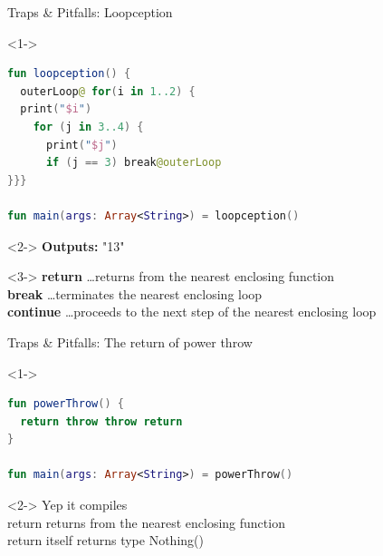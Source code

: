 \begin{frame}[fragile]{Traps \& Pitfalls: Loopception}
	\begin{overlayarea}{\textwidth}{\textheight}
		\begin{onlyenv}<1->
\begin{lstlisting}[language=Kotlin,basicstyle=\ttfamily\small]
fun loopception() {
  outerLoop@ for(i in 1..2) {
  print("$i")
    for (j in 3..4) {
      print("$j")
      if (j == 3) break@outerLoop
}}}

fun main(args: Array<String>) = loopception()
\end{lstlisting}
		\end{onlyenv}
		\begin{onlyenv}<2->
			\textbf{Outputs:} "13"\\\vspace{\baselineskip}
		\end{onlyenv}
		\begin{onlyenv}<3->
			\textbf{return} \dots returns from the nearest enclosing function\\
			\textbf{break} \dots terminates the nearest enclosing loop\\
			\textbf{continue} \dots proceeds to the next step of the nearest enclosing loop
		\end{onlyenv}
	\end{overlayarea}
\end{frame}


\begin{frame}[fragile]{Traps \& Pitfalls: The return of power throw}
	\begin{overlayarea}{\textwidth}{.5\textheight}
		\begin{onlyenv}<1->
\begin{lstlisting}[language=Kotlin,basicstyle=\ttfamily\small]
fun powerThrow() {
  return throw throw return
}

fun main(args: Array<String>) = powerThrow()
\end{lstlisting}
		\end{onlyenv}
		\begin{onlyenv}<2->
			Yep it compiles\\
			return returns from the nearest enclosing function\\
			return itself returns type Nothing()
		\end{onlyenv}
	\end{overlayarea}
\end{frame}

